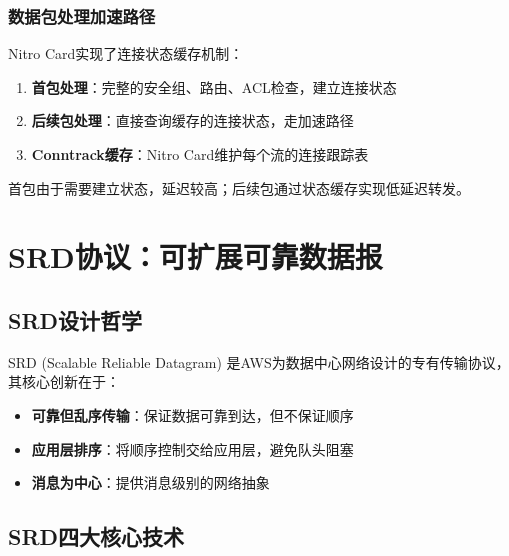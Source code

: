 \subsubsection{数据包处理加速路径}

Nitro Card实现了连接状态缓存机制：

\begin{enumerate}
    \item \textbf{首包处理}：完整的安全组、路由、ACL检查，建立连接状态
    \item \textbf{后续包处理}：直接查询缓存的连接状态，走加速路径
    \item \textbf{Conntrack缓存}：Nitro Card维护每个流的连接跟踪表
\end{enumerate}

首包由于需要建立状态，延迟较高；后续包通过状态缓存实现低延迟转发。

\section{SRD协议：可扩展可靠数据报}

\subsection{SRD设计哲学}

SRD (Scalable Reliable Datagram) 是AWS为数据中心网络设计的专有传输协议，其核心创新在于：

\begin{itemize}
    \item \textbf{可靠但乱序传输}：保证数据可靠到达，但不保证顺序
    \item \textbf{应用层排序}：将顺序控制交给应用层，避免队头阻塞
    \item \textbf{消息为中心}：提供消息级别的网络抽象
\end{itemize}

\subsection{SRD四大核心技术}

